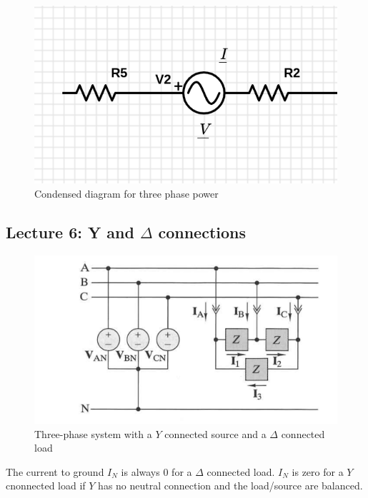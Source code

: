 \documentclass[10pt]{article}
\begin{document}
\begin{figure}[H]
	\centering
	\includegraphics[width=0.8\linewidth]{img/image_2022-09-18-02-35-24.png}
	\caption{Condensed diagram for three phase power}
\end{figure}


\subsection{Lecture 6: Y and $ \Delta $ connections }

\begin{figure}[H]
	\centering
	\includegraphics[width=0.8\linewidth]{img/image_2022-09-19-11-25-58.png}
	\caption{Three-phase system with a $ Y $ connected source and a $ \Delta $ connected load}
\end{figure}

The current to ground $ I_N $ is always $ 0 $ for a $ \Delta $ connected load. $ I_N $ is zero for a $ Y $ cnonnected load if $ Y $ has no neutral connection and the load/source are balanced.
\end{document}
